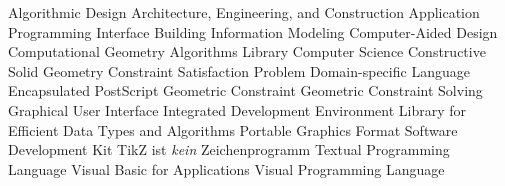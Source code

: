 \begin{acronym}[B-Rep]
     {Algorithmic Design}
    {Architecture, Engineering, and Construction}
    {Application Programming Interface}
    {Building Information Modeling}
    {Computer-Aided Design}
   {Computational Geometry Algorithms Library}
     {Computer Science}
    {Constructive Solid Geometry}
    {Constraint Satisfaction Problem}
    {Domain-specific Language}
    {Encapsulated PostScript}
     {Geometric Constraint}
    {Geometric Constraint Solving}
    {Graphical User Interface}
    {Integrated Development Environment}
   {Library for Efficient Data Types and Algorithms}
    {Portable Graphics Format}
    {Software Development Kit}
   {TikZ ist \textit{kein} Zeichenprogramm}
    {Textual Programming Language}
    {Visual Basic for Applications}
    {Visual Programming Language}
\end{acronym}
